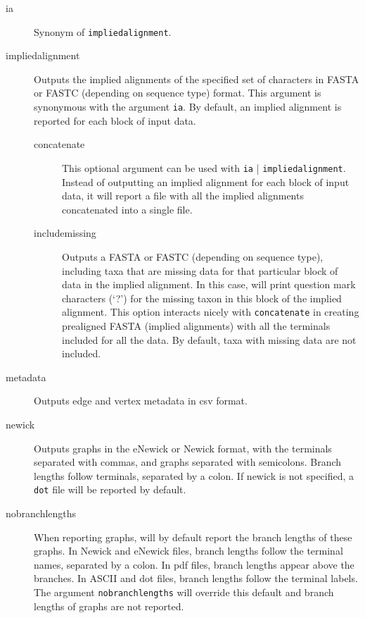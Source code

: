 \begin{description}
		\item[ia] Synonym of \texttt{impliedalignment}.
		
		\item[impliedalignment] Outputs the implied alignments of the specified 
		set of characters in FASTA or FASTC (depending on sequence type) format. 
		This argument is synonymous with the argument \texttt{ia}. By default, 
		an implied alignment is reported for each block of input data. 
		
		\begin{description}
		
			\item[concatenate] This optional argument can be used with \texttt{ia}
			| \texttt{impliedalignment}. Instead of outputting an implied alignment 
			for each block of input data, it will report a file with all the implied 
			alignments concatenated into a single file.
			
			\item[includemissing] Outputs a FASTA or FASTC (depending on sequence 
			type), including taxa that are missing data for that particular block of data in 
			the implied alignment. In this case, \phyg will print question mark characters 
			(`?') for the missing taxon in this block of the implied alignment. This option 
			interacts nicely with \texttt{concatenate} in creating prealigned FASTA 
			(implied alignments) with all the terminals included for all the data. By default, 
			taxa with missing data are not included.
			
		\end{description}
				
		\item[metadata] Outputs edge and vertex metadata in csv 	format.
		
		\item[newick] Outputs graphs in the eNewick or Newick format, with the terminals
		separated with commas, and graphs separated with semicolons. Branch
		lengths follow terminals, separated by a colon. If newick is not specified, 
		a \texttt{dot} file will be reported by default.
		
		\item[nobranchlengths] When reporting graphs, \phyg will by default 
		report the branch lengths of these graphs. In Newick and eNewick files, 
		branch lengths follow the terminal names, separated by a colon. In pdf 
		files, branch lengths appear above the branches. In ASCII and 
		dot files, branch lengths follow the terminal labels. The argument
		\texttt{nobranchlengths} will override this default and branch lengths 
		of graphs are not reported.
		

\end{description}

